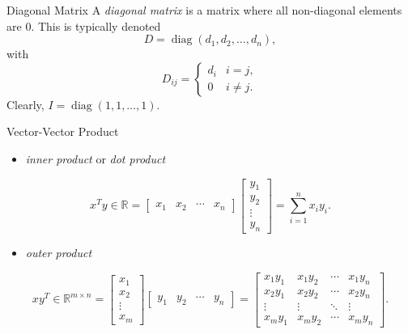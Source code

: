 \documentclass[aspectratio=169,12pt]{beamer}
\DeclareMathOperator{\diag}{diag}
\begin{document}
\begin{frame}[t]{Diagonal Matrix}
  \vspace{0.52cm}
  {\large
  A \emph{diagonal matrix} is a matrix where all non-diagonal elements are $0$.
  This is typically denoted
  \[
    D=\diag(d_1,d_2,\ldots,d_n),
  \]
  with
  \[
    D_{ij}=\begin{cases}
      d_i & i=j,\\
      0 & i\ne j.
    \end{cases}
  \]
  Clearly, $I=\diag(1,1,\ldots,1)$.
  }
\end{frame}

\begin{frame}[t]{Vector-Vector Product}
  \vspace{-0.10cm}
  {\small
  \begin{itemize}
    \item \emph{inner product} or \emph{dot product}
  \end{itemize}
  \[
    x^Ty\in\mathbb{R}
    =\begin{bmatrix}x_1&x_2&\cdots&x_n\end{bmatrix}
     \begin{bmatrix}y_1\\y_2\\\vdots\\y_n\end{bmatrix}
    =\sum_{i=1}^{n}x_i y_i.
  \]
  \vspace{0.18cm}
  \begin{itemize}
    \item \emph{outer product}
  \end{itemize}
  \[
    xy^T\in\mathbb{R}^{m\times n}
    =\begin{bmatrix}x_1\\x_2\\\vdots\\x_m\end{bmatrix}
     \begin{bmatrix}y_1&y_2&\cdots&y_n\end{bmatrix}
    =\begin{bmatrix}
      x_1y_1&x_1y_2&\cdots&x_1y_n\\
      x_2y_1&x_2y_2&\cdots&x_2y_n\\
      \vdots&\vdots&\ddots&\vdots\\
      x_my_1&x_my_2&\cdots&x_my_n
    \end{bmatrix}.
  \]
  }
\end{frame}
\end{document}
